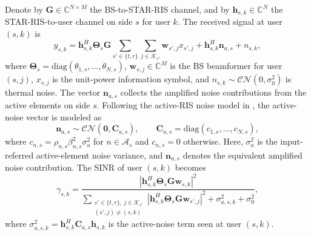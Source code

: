 \documentclass[journal]{IEEEtran}
\begin{document}
Denote by $\mathbf{G}\in\mathbb{C}^{N\times M}$ the BS-to-STAR-RIS channel, and by $\mathbf{h}_{s,k}\in\mathbb{C}^N$ the STAR-RIS-to-user channel on side $s$ for user $k$. The received signal at user $(s,k)$ is
\begin{equation}
y_{s,k}=\mathbf{h}_{s,k}^H\mathbf{\Theta}_s\mathbf{G}
\sum_{s'\in\{t,r\}}\sum_{j\in\mathcal{K}_{s'}}\mathbf{w}_{s',j}x_{s',j}
+\mathbf{h}_{s,k}^H\mathbf{n}_{a,s}+n_{s,k},
\label{eq:received}
\end{equation}
where $\mathbf{\Theta}_s=\mathrm{diag}(\theta_{1,s},\ldots,\theta_{N,s})$, $\mathbf{w}_{s,j}\in\mathbb{C}^{M}$ is the BS beamformer for user $(s,j)$, $x_{s,j}$ is the unit-power information symbol, and $n_{s,k}\sim\mathcal{CN}(0,\sigma_0^2)$ is thermal noise. The vector $\mathbf{n}_{a,s}$ collects the amplified noise contributions from the active elements on side $s$. Following the active-RIS noise model in \cite{zhang2022signal,ma2023activeee}, the active-noise vector is modeled as
\begin{equation}
\mathbf{n}_{a,s}\sim\mathcal{CN}(\mathbf{0},\mathbf{C}_{a,s}),\qquad
\mathbf{C}_{a,s}=\mathrm{diag}(c_{1,s},\ldots,c_{N,s}),
\label{eq:na_stat}
\end{equation}
where $c_{n,s}=\rho_{n,s}\beta_{n,s}^2\sigma_a^2$ for $n\in\mathcal{A}_s$ and $c_{n,s}=0$ otherwise. Here, $\sigma_a^2$ is the input-referred active-element noise variance, and $\mathbf n_{a,s}$ denotes the equivalent amplified noise contribution. The SINR of user $(s,k)$ becomes
\begin{equation}
\gamma_{s,k}=
\frac{\left|\mathbf{h}_{s,k}^H\mathbf{\Theta}_s\mathbf{G}\mathbf{w}_{s,k}\right|^2}
{\sum_{\substack{s'\in\{t,r\},\ j\in\mathcal{K}_{s'}\\(s',j)\ne(s,k)}}
\left|\mathbf{h}_{s,k}^H\mathbf{\Theta}_s\mathbf{G}\mathbf{w}_{s',j}\right|^2
+\sigma_{a,s,k}^2+\sigma_0^2},
\label{eq:sinr_full}
\end{equation}
where $\sigma_{a,s,k}^2=\mathbf{h}_{s,k}^H\mathbf{C}_{a,s}\mathbf{h}_{s,k}$ is the active-noise term seen at user $(s,k)$.
\end{document}
